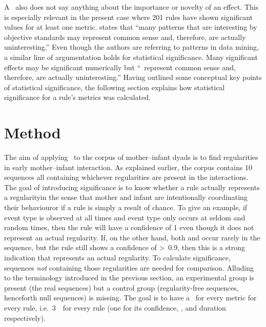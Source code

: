 A \pv\ also does not say anything about the importance or novelty of an effect.
This is especially relevant in the present case where 201 rules have shown significant values for at least one metric.
\citet[]{han_data_2012} states that ``many patterns that are interesting by objective standards may represent common sense and, therefore, are actually uninteresting.''
Even though the authors are referring to patterns in data mining, a similar line of argumentation holds for statistical significance.
Many significant effects may be significant numerically but ``\citeellipses\ represent common sense and, therefore, are actually uninteresting.''
Having outlined some conceptual key points of statistical significance, the following section explains how statistical significance for a rule's metrics was calculated.




\section{Method}
\label{sec:sigmet}
The aim of applying \fpmlower\ to the corpus of mother--infant dyads is to find regularities in early mother--infant interaction.
As explained earlier, the corpus contains 10 sequences all containing whichever regularities are present in the interactions.
The goal of introducing significance is to know whether a rule actually represents a regularity\dash in the sense that mother and infant are intentionally coordinating their behaviour\dash or if a rule is simply a result of chance.
To give an example, if event type  is observed at all times and event type  only occurs at seldom and random times, then the rule  will have a confidence of 1 even though it does not represent an actual regularity.
If, on the other hand, both  and  occur rarely in the sequence, but the rule still shows a confidence of >~0.9, then this is a strong indication that  represents an actual regularity.
To calculate significance, sequences \emph{not} containing those regularities are needed for comparison.
Alluding to the terminology introduced in the previous section, an experimental group is present (the real sequences) but a control group (regularity-free sequences, henceforth null sequences) is missing.
The goal is to have a \pv\ for every metric for every rule, i.e.~3~\pv\ for every rule (one for its confidence, \noc, and duration respectively).%

